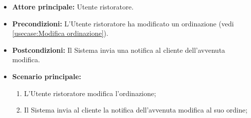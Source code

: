 \label{usecase:Notifica modifica ordinazione al cliente}
\begin{itemize}
	\item \textbf{Attore principale:} Utente ristoratore.

	\item \textbf{Precondizioni:} L'Utente ristoratore ha modificato un ordinazione (vedi \autoref{usecase:Modifica ordinazione}).

	\item \textbf{Postcondizioni:} Il Sistema invia una notifica al cliente dell'avvenuta modifica.

	\item \textbf{Scenario principale:}
	      \begin{enumerate}
		      \item L'Utente ristoratore modifica l'ordinazione;
		      \item Il Sistema invia al cliente la notifica dell'avvenuta modifica al suo ordine;
	      \end{enumerate}
\end{itemize}